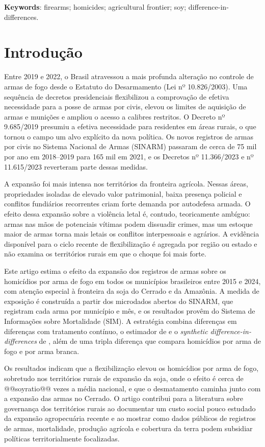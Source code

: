 \documentclass[12pt,a4paper]{article}
\begin{document}
\noindent\textbf{Keywords}: firearms; homicides; agricultural frontier; soy; difference-in-differences.

\section{Introdução}

Entre 2019 e 2022, o Brasil atravessou a mais profunda alteração no controle de armas de fogo desde o Estatuto do Desarmamento (Lei nº 10.826/2003). Uma sequência de decretos presidenciais flexibilizou a comprovação de efetiva necessidade para a posse de armas por civis, elevou os limites de aquisição de armas e munições e ampliou o acesso a calibres restritos. O Decreto nº 9.685/2019 presumiu a efetiva necessidade para residentes em áreas rurais, o que tornou o campo um alvo explícito da nova política. Os novos registros de armas por civis no Sistema Nacional de Armas (SINARM) passaram de cerca de 75 mil por ano em 2018--2019 para 165 mil em 2021, e os Decretos nº 11.366/2023 e nº 11.615/2023 reverteram parte dessas medidas.

A expansão foi mais intensa nos territórios da fronteira agrícola. Nessas áreas, propriedades isoladas de elevado valor patrimonial, baixa presença policial e conflitos fundiários recorrentes criam forte demanda por autodefesa armada. O efeito dessa expansão sobre a violência letal é, contudo, teoricamente ambíguo: armas nas mãos de potenciais vítimas podem dissuadir crimes, mas um estoque maior de armas torna mais letais os conflitos interpessoais e agrários. A evidência disponível para o ciclo recente de flexibilização é agregada por região ou estado \citep{baculi2021,wakim2025} e não examina os territórios rurais em que o choque foi mais forte.

Este artigo estima o efeito da expansão dos registros de armas sobre os homicídios por arma de fogo em todos os municípios brasileiros entre 2015 e 2024, com atenção especial à fronteira da soja do Cerrado e da Amazônia. A medida de exposição é construída a partir dos microdados abertos do SINARM, que registram cada arma por município e mês, e os resultados provêm do Sistema de Informações sobre Mortalidade (SIM). A estratégia combina diferenças em diferenças com tratamento contínuo, o estimador de \citet{callaway2021} e o \textit{synthetic difference-in-differences} de \citet{arkhangelsky2021}, além de uma tripla diferença que compara homicídios por arma de fogo e por arma branca.

Os resultados indicam que a flexibilização elevou os homicídios por arma de fogo, sobretudo nos territórios rurais de expansão da soja, onde o efeito é cerca de @@soyratio@@ vezes a média nacional, e que o desmatamento caminha junto com a expansão das armas no Cerrado. O artigo contribui para a literatura sobre governança dos territórios rurais ao documentar um custo social pouco estudado da expansão agropecuária recente e ao mostrar como dados públicos de registros de armas, mortalidade, produção agrícola e cobertura da terra podem subsidiar políticas territorialmente focalizadas.
\end{document}
